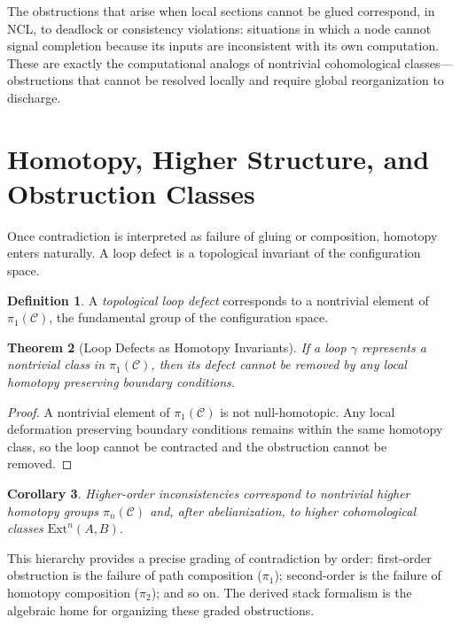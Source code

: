 \documentclass[12pt,a4paper,openany]{book}
\theoremstyle{plain}
\newtheorem{theorem}{Theorem}[chapter]
\newtheorem{corollary}[theorem]{Corollary}
\theoremstyle{definition}
\newtheorem{definition}[theorem]{Definition}
\theoremstyle{remark}
\begin{document}
The obstructions that arise when local sections cannot be glued correspond, in NCL, to deadlock or consistency violations: situations in which a node cannot signal completion because its inputs are inconsistent with its own computation. These are exactly the computational analogs of nontrivial cohomological classes---obstructions that cannot be resolved locally and require global reorganization to discharge.


\section{Homotopy, Higher Structure, and Obstruction Classes}
\label{sec:homotopy_obstruction}

Once contradiction is interpreted as failure of gluing or composition, homotopy enters naturally. A loop defect is a topological invariant of the configuration space.

\begin{definition}
A \emph{topological loop defect} corresponds to a nontrivial element of $\pi_1(\mathcal{C})$, the fundamental group of the configuration space.
\end{definition}

\begin{theorem}[Loop Defects as Homotopy Invariants]
If a loop $\gamma$ represents a nontrivial class in $\pi_1(\mathcal{C})$, then its defect cannot be removed by any local homotopy preserving boundary conditions.
\end{theorem}

\begin{proof}
A nontrivial element of $\pi_1(\mathcal{C})$ is not null-homotopic. Any local deformation preserving boundary conditions remains within the same homotopy class, so the loop cannot be contracted and the obstruction cannot be removed.
\end{proof}

\begin{corollary}
Higher-order inconsistencies correspond to nontrivial higher homotopy groups $\pi_n(\mathcal{C})$ and, after abelianization, to higher cohomological classes $\mathrm{Ext}^n(A,B)$.
\end{corollary}

This hierarchy provides a precise grading of contradiction by order: first-order obstruction is the failure of path composition ($\pi_1$); second-order is the failure of homotopy composition ($\pi_2$); and so on. The derived stack formalism is the algebraic home for organizing these graded obstructions.
\end{document}
